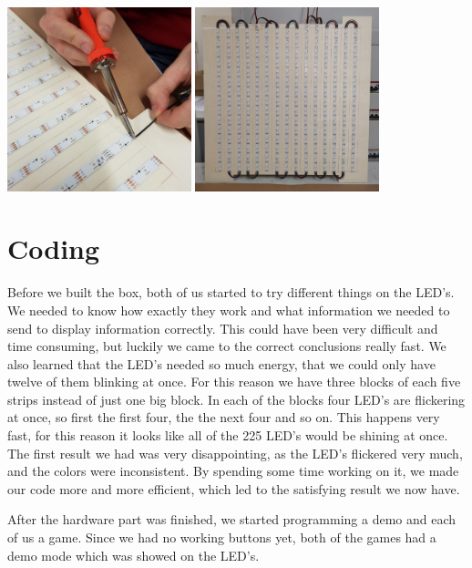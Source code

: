 \documentclass[a4paper,12pt]{article}
\begin{document}
{ \centering
  \includegraphics[width = 0.4\textwidth]{loten.jpg}
  \space{   }
  \includegraphics[width = 0.4\textwidth]{matrix.jpg}
  \\}
 \vspace{1cm}
 
\section{Coding}
Before we built the box, both of us started to try different things on the LED's.
 We needed to know how exactly they work and what information we needed to send to display information correctly.
 This could have been very difficult and time consuming, but luckily we came to the correct conclusions really fast. 
 We also learned that  the LED's needed so much energy, that we could only have twelve of them blinking at once.
 For this reason we have three blocks of each five strips instead of just one big block.
 In each of the blocks four LED's are flickering at once, so first the first four, the the next four and so on.
 This happens very fast, for this reason it looks like all of the 225 LED's would be shining at once.
 The first result we had was very disappointing, as the LED's flickered very much, and the colors were inconsistent.
 By spending some time working on it, we made our code more and more efficient, which led to the satisfying result we now have.

After the hardware part was finished, we started programming a demo and each of us a game.
 Since we had no working buttons yet, both of the games had a demo mode which was showed on the LED's.
\end{document}
